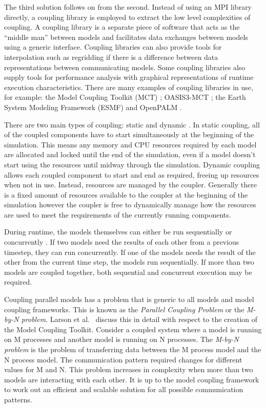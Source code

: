 \documentclass{acm_proc_article-sp}
\renewcommand{\_}{\underscore\hspace{0pt}}
\begin{document}
The third solution \cite{Thevenin} follows on from the second. Instead of using
an MPI library directly, a coupling library is employed to extract the low level
complexities of coupling. A coupling library is a separate piece of software
that acts as the ``middle man'' between models and facilitates data exchanges
between models using a generic interface. Coupling libraries can also provide
tools for interpolation such as regridding \cite{Kuinghttons} if there is a
difference between data representations between communicating models. Some
coupling libraries also supply tools for performance analysis with graphical
representations of runtime execution characteristics. There are many examples of
coupling libraries in use, for example: the Model Coupling Toolkit (MCT)
\cite{Larson2005,Jacob2005}; OASIS3-MCT \cite{Valcke,Valcke2013}; the Earth
System Modeling Framework (ESMF) \cite{Ramework2004} and OpenPALM
\cite{Piacentini2011}.

There are two main types of coupling: static and dynamic
\cite{Thevenin,Piacentini2011}. In static coupling, all of the coupled
components have to start simultaneously at the beginning of the simulation. This
means any memory and CPU resources required by each model are allocated and
locked until the end of the simulation, even if a model doesn't start using the
resources until midway through the simulation. Dynamic coupling allows each
coupled component to start and end as required, freeing up resources when not in
use. Instead, resources are managed by the coupler. Generally there is a fixed
amount of resources available to the coupler at the beginning of the simulation
however the coupler is free to dynamically manage how the resources are used to
meet the requirements of the currently running components.

During runtime, the models themselves can either be run sequentially or
concurrently \cite{Maisonnave}. If two models need the results of each other
from a previous timestep, they can run concurrently. If one of the models needs
the result of the other from the current time step, the models run sequentially.
If more than two models are coupled together, both sequential and concurrent
execution may be required.

Coupling parallel models has a problem that is generic to all models and model
coupling frameworks. This is known as the \textit{Parallel Coupling Problem} or
the \textit{M-by-N problem}. Larson et al.\ \cite{Larson2005,Jacob2005} discuss
this in detail with respect to the creation of the Model Coupling Toolkit.
Consider a coupled system where a model is running on M processes and another
model is running on N processes. The \textit{M-by-N problem} is the problem of
transferring data between the M process model and the N process model. The
communication pattern required changes for different values for M and N. This
problem increases in complexity when more than two models are interacting with
each other. It is up to the model coupling framework to work out an efficient
and scalable solution for all possible communication patterns.
\end{document}
